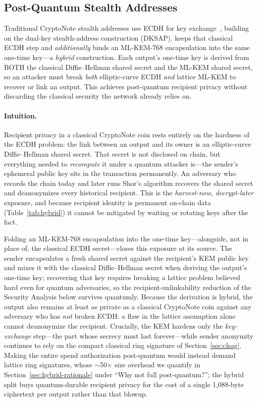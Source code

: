 \subsection{Post-Quantum Stealth Addresses}
\label{sec:pq-stealth}

Traditional CryptoNote stealth addresses use ECDH for key
exchange~\cite{cryptonote,courtois-stealth}, building on the dual-key
stealth-address construction (DKSAP). \Botho keeps that classical ECDH step
and \emph{additionally} binds an ML-KEM-768 encapsulation into the same
one-time key---a \emph{hybrid} construction. Each output's one-time key is
derived from BOTH the classical Diffie--Hellman shared secret and the ML-KEM
shared secret, so an attacker must break \emph{both} elliptic-curve ECDH
\emph{and} lattice ML-KEM to recover or link an output. This achieves
post-quantum recipient privacy without discarding the classical security the
network already relies on.

\paragraph{Intuition.}
Recipient privacy in a classical CryptoNote coin rests entirely on the
hardness of the ECDH problem: the link between an output and its owner is an
elliptic-curve Diffie--Hellman shared secret. That secret is not disclosed on
chain, but everything needed to \emph{recompute} it under a quantum attacker
is---the sender's ephemeral public key sits in the transaction permanently.
An adversary who records the chain today and later runs Shor's algorithm
recovers the shared secret and deanonymizes every historical recipient. This
is the \emph{harvest-now, decrypt-later} exposure, and because recipient
identity is permanent on-chain data (Table~\ref{tab:hybrid}) it cannot be
mitigated by waiting or rotating keys after the fact.

Folding an ML-KEM-768 encapsulation into the one-time key---alongside, not in
place of, the classical ECDH secret---closes this exposure at its source. The
sender encapsulates a fresh shared secret against the recipient's KEM public
key and mixes it with the classical Diffie--Hellman secret when deriving the
output's one-time key; recovering that key requires breaking a lattice problem
believed hard even for quantum adversaries, so the recipient-unlinkability
reduction of the Security Analysis below survives quantumly. Because the
derivation is hybrid, the output also remains at least as private as a classical
CryptoNote coin against any adversary who has \emph{not} broken ECDH: a flaw in
the lattice assumption alone cannot deanonymize the recipient. Crucially,
the KEM hardens only the \emph{key-exchange} step---the part whose secrecy
must last forever---while sender anonymity continues to rely on the compact
classical ring signature of Section~\ref{sec:clsag}. Making the entire spend
authorization post-quantum would instead demand lattice ring signatures, whose
$\sim$50$\times$ size overhead we quantify in
Section~\ref{sec:hybrid-rationale} under ``Why not full post-quantum?''; the
hybrid split buys quantum-durable recipient privacy for the cost of a single
1{,}088-byte ciphertext per output rather than that blowup.

